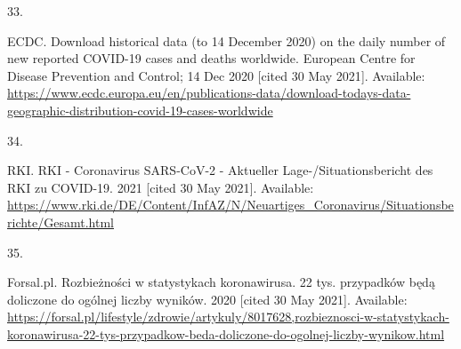 \documentclass[10pt,letterpaper]{article} %
\newlength{\cslhangindent}
\newlength{\csllabelwidth}
\newlength{\cslentryspacingunit} %
\newenvironment{CSLReferences}[2] %
 {%
  \setlength{\parindent}{0pt}
  \ifodd #1
  \let\oldpar\par
  \def\par{\hangindent=\cslhangindent\oldpar}
  \fi
  \setlength{\parskip}{#2\cslentryspacingunit}
 }%
 {}
\newcommand{\CSLLeftMargin}[1]{\parbox[t]{\csllabelwidth}{#1}}
\newcommand{\CSLRightInline}[1]{\parbox[t]{\linewidth - \csllabelwidth}{#1}\break}
\providecommand{\DIFaddbegin}{} %
\providecommand{\DIFaddend}{} %
\providecommand{\DIFdelbegin}{} %
\providecommand{\DIFdelend}{} %
\newcommand{\DIFscaledelfig}{0.5}
\newlength{\DIFdelgraphicswidth} %
\newlength{\DIFdelgraphicsheight} %
\newcommand{\DIFaddincludegraphics}[2][]{{\color{blue}\fbox{\DIFOincludegraphics[#1]{#2}}}} %
\newcommand{\DIFdelincludegraphics}[2][]{%
\sbox{\DIFdelgraphicsbox}{\DIFOincludegraphics[#1]{#2}}%
\settoboxwidth{\DIFdelgraphicswidth}{\DIFdelgraphicsbox} %
\settoboxtotalheight{\DIFdelgraphicsheight}{\DIFdelgraphicsbox} %
\scalebox{\DIFscaledelfig}{%
\parbox[b]{\DIFdelgraphicswidth}{\usebox{\DIFdelgraphicsbox}\\[-\baselineskip] \rule{\DIFdelgraphicswidth}{0em}}\llap{\resizebox{\DIFdelgraphicswidth}{\DIFdelgraphicsheight}{%
\setlength{\unitlength}{\DIFdelgraphicswidth}%
\begin{picture}(1,1)%
\thicklines\linethickness{2pt} %
{\color[rgb]{1,0,0}\put(0,0){\framebox(1,1){}}}%
{\color[rgb]{1,0,0}\put(0,0){\line( 1,1){1}}}%
{\color[rgb]{1,0,0}\put(0,1){\line(1,-1){1}}}%
\end{picture}%
}\hspace*{3pt}}} %
} %
\DeclareRobustCommand{\DIFaddbegin}{\DIFOaddbegin \let\includegraphics\DIFaddincludegraphics} %
\DeclareRobustCommand{\DIFaddend}{\DIFOaddend \let\includegraphics\DIFOincludegraphics} %
\DeclareRobustCommand{\DIFdelbegin}{\DIFOdelbegin \let\includegraphics\DIFdelincludegraphics} %
\DeclareRobustCommand{\DIFdelend}{\DIFOaddend \let\includegraphics\DIFOincludegraphics} %
\begin{document}
\begin{CSLReferences}{0}{0}
\leavevmode{}%
\CSLLeftMargin{33. }
\DIFdelbegin %
\DIFdelend \DIFaddbegin \CSLRightInline{ECDC. Download historical data (to 14 {December} 2020)
on the daily number of new reported {COVID-19} cases and deaths
worldwide. {European Centre for Disease Prevention and Control}; 14 Dec
2020 {[}cited 30 May 2021{]}. Available:
\url{https://www.ecdc.europa.eu/en/publications-data/download-todays-data-geographic-distribution-covid-19-cases-worldwide}}
\DIFaddend 

\leavevmode{}%
\CSLLeftMargin{34. }
\DIFdelbegin %
\DIFdelend \DIFaddbegin \CSLRightInline{RKI. {RKI} - {Coronavirus SARS-CoV-2} - {Aktueller
Lage-}/{Situationsbericht} des {RKI} zu {COVID-19}. 2021 {[}cited 30 May
2021{]}. Available:
\url{https://www.rki.de/DE/Content/InfAZ/N/Neuartiges_Coronavirus/Situationsberichte/Gesamt.html}}
\DIFaddend 

\leavevmode{}%
\CSLLeftMargin{35. }
\DIFdelbegin %
\DIFdelend \DIFaddbegin \CSLRightInline{Forsal.pl. Rozbieżności w statystykach koronawirusa. 22
tys. przypadków będą doliczone do ogólnej liczby wyników. 2020 {[}cited
30 May 2021{]}. Available:
\url{https://forsal.pl/lifestyle/zdrowie/artykuly/8017628,rozbieznosci-w-statystykach-koronawirusa-22-tys-przypadkow-beda-doliczone-do-ogolnej-liczby-wynikow.html}}
\DIFaddend 


\end{CSLReferences}
\end{document}
